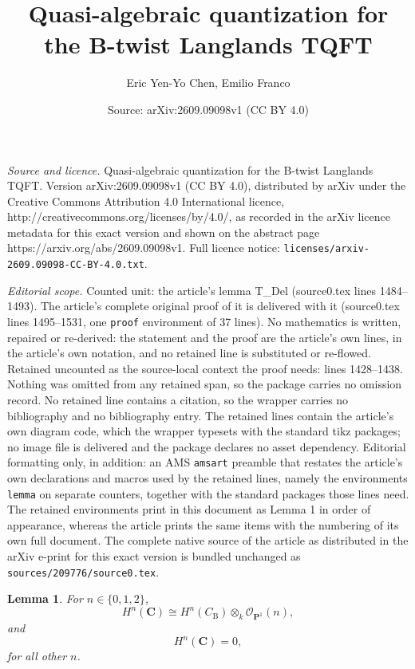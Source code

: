 \documentclass[10pt,a4paper]{amsart}
\title{Quasi-algebraic quantization for the B-twist Langlands TQFT}
\author{Eric Yen-Yo Chen, Emilio Franco}
\date{Source: arXiv:2609.09098v1 (CC BY 4.0)}
\newtheorem{lemma}{Lemma}
\newcommand{\B}{\mathrm{B}}
\newcommand{\C}{\mathbf{C}}
\newcommand{\Oo}{\mathcal{O}}
\renewcommand{\P}{\mathbf{P}}
\begin{document}
\maketitle

\noindent\emph{Source and licence.} Quasi-algebraic quantization for the B-twist Langlands TQFT. Version arXiv:2609.09098v1 (CC BY 4.0), distributed by arXiv under the Creative Commons Attribution 4.0 International licence, http://creativecommons.org/licenses/by/4.0/, as recorded in the arXiv licence metadata for this exact version and shown on the abstract page https://arxiv.org/abs/2609.09098v1. Full licence notice: \texttt{licenses/arxiv-2609.09098-CC-BY-4.0.txt}.\par\smallskip

\noindent\textit{Editorial scope.} Counted unit: the article's lemma T\_Del (source0.tex lines 1484--1493). The article's complete original proof of it is delivered with it (source0.tex lines 1495--1531, one \texttt{proof} environment of 37 lines). No mathematics is written, repaired or re-derived: the statement and the proof are the article's own lines, in the article's own notation, and no retained line is substituted or re-flowed.  Retained uncounted as the source-local context the proof needs: lines 1428--1438.  Nothing was omitted from any retained span, so the package carries no omission record.  No retained line contains a citation, so the wrapper carries no bibliography and no bibliography entry.  The retained lines contain the article's own diagram code, which the wrapper typesets with the standard tikz packages; no image file is delivered and the package declares no asset dependency.  Editorial formatting only, in addition: an AMS \texttt{amsart} preamble that restates the article's own declarations and macros used by the retained lines, namely the environments \texttt{lemma} on separate counters, together with the standard packages those lines need.  The retained environments print in this document as Lemma 1 in order of appearance, whereas the article prints the same items with the numbering of its own full document.  The complete native source of the article as distributed in the arXiv e-print for this exact version is bundled unchanged as \texttt{sources/209776/source0.tex}.
\begin{lemma} \label{lm cohomology of the curve}
For $n \in \{ 0, 1, 2 \}$, 
\[
H^n(\C) \cong H^n(C_{\B}) \otimes_k \Oo_{\P^1}(n),
\]
and 
\[
H^n(\C) = 0,
\]
for all other $n$.
\end{lemma}
\end{document}
